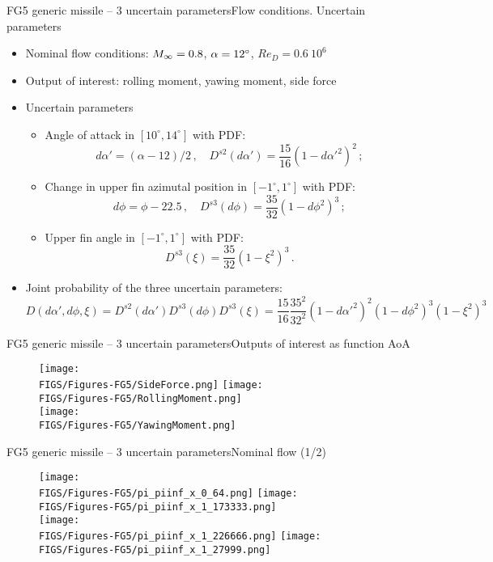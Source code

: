 \documentclass[10pt]{beamer}
\def\begit{\begin{itemize}}
\def\endit{\end{itemize}}
\newcommand{\Mach}{M}
\begin{document}

\begin{frame}{FG5 generic missile -- 3 uncertain parameters}{Flow conditions. Uncertain parameters}  

\begit
\item Nominal flow conditions: $\smash{\Mach_\infty}=0.8$, $\alpha=\smash{12^\circ}$, $Re_D=0.6~ 10^6$ 
\item Output of interest: rolling moment, yawing moment, side force
\item Uncertain parameters
  \begit
  \item Angle of attack in $[10^\circ,14^\circ]$ with PDF:
   $$  d\alpha' = (\alpha-12)/2\,,\quad D^{s2}(d\alpha')= \frac{15}{16}(1-d\alpha'^2)^2\,; $$
  \item Change in upper fin azimutal position in $[-1^\circ,1^\circ]$ with PDF: 
    $$  d\phi = \phi- 22.5\,,\quad D^{s3}(d\phi)= \frac{35}{32}(1-d\phi^2)^3\,; $$
  \item Upper fin angle in $[-1^\circ,1^\circ]$ with PDF:
    $$  D^{s3}(\xi)= \frac{35}{32}(1-\xi^2)^3\,. $$ 
  \endit
\item Joint probability of the three uncertain parameters:
  $$\!\!\!\!\!\!\!\! D(d\alpha',d\phi,\xi)= D^{s2}(d\alpha')D^{s3}(d\phi)D^{s3}(\xi)=\frac{15}{16}\frac{35^2}{32^2} (1-d\alpha'^2)^2 (1-d\phi^2)^3 (1-\xi^2)^3  $$ 
\endit
%
\end{frame} 
%
%
\begin{frame}{FG5 generic missile -- 3 uncertain parameters}{Outputs of interest as function AoA}  
%
\begin{figure}[!h]
\begin{center}
\texttt{[image: \\FIGS/Figures-FG5/SideForce.png]}
\texttt{[image: \\FIGS/Figures-FG5/RollingMoment.png]}
\\
\texttt{[image: \\FIGS/Figures-FG5/YawingMoment.png]}
\end{center}
\end{figure}
%
\end{frame} 
%
%
%
\begin{frame}{FG5 generic missile -- 3 uncertain parameters}{Nominal flow (1/2)}  
%
\begin{figure}[!h]
\begin{center}
\texttt{[image: \\FIGS/Figures-FG5/pi\_piinf\_x\_0\_64.png]}
\texttt{[image: \\FIGS/Figures-FG5/pi\_piinf\_x\_1\_173333.png]}
\\
\texttt{[image: \\FIGS/Figures-FG5/pi\_piinf\_x\_1\_226666.png]}
\texttt{[image: \\FIGS/Figures-FG5/pi\_piinf\_x\_1\_27999.png]}
\end{center}
\end{figure}
%
\end{frame} 
\end{document}

